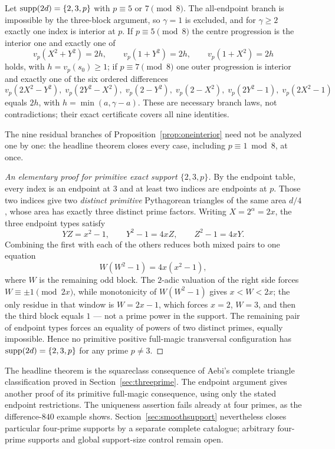 \begin{proposition}\label{prop:oneinterior}
Let $\operatorname{supp}(2d)=\{2,3,p\}$ with $p\equiv5$ or $7\pmod8$. The all-endpoint
branch is impossible by the three-block argument, so $\gamma=1$ is
excluded, and for $\gamma\ge2$ exactly one index is interior at $p$. If
$p\equiv5\pmod8$ the centre progression is the interior one and exactly one
of
\[
v_p(X^2+Y^2)=2h,\qquad v_p(1+Y^2)=2h,\qquad v_p(1+X^2)=2h
\]
holds, with $h=v_p(s_0)\ge1$; if $p\equiv7\pmod8$ one outer progression is
interior and exactly one of the six ordered differences
\[
v_p(2X^2-Y^2),\; v_p(2Y^2-X^2),\; v_p(2-Y^2),\;
v_p(2-X^2),\; v_p(2Y^2-1),\; v_p(2X^2-1)
\]
equals $2h$, with $h=\min(a,\gamma-a)$. These are necessary branch laws,
not contradictions; their exact certificate covers all nine identities.
\end{proposition}

The nine residual branches of Proposition~\ref{prop:oneinterior} need not
be analyzed one by one: the headline theorem closes every case, including
$p\equiv1\bmod8$, at once.

\begin{proof}[An elementary proof for primitive exact support $\{2,3,p\}$]
By the endpoint table, every index is an endpoint at $3$ and at least two
indices are endpoints at $p$. Those two indices give two \emph{distinct
primitive} Pythagorean triangles of the same area $d/4$, whose area has
exactly three distinct prime factors. Writing $X=2^{\alpha}=2x$, the three
endpoint types satisfy
\[
YZ=x^2-1,\qquad Y^2-1=4xZ,\qquad Z^2-1=4xY .
\]
Combining the first with each of the others reduces both mixed pairs to
one equation
\[
W(W^2-1)=4x(x^2-1),
\]
where $W$ is the remaining odd block. The $2$-adic valuation of the right
side forces $W\equiv\pm1\pmod{2x}$, while monotonicity of $W(W^2-1)$ gives
$x<W<2x$; the only residue in that window is $W=2x-1$, which forces
$x=2$, $W=3$, and then the third block equals $1$ --- not a prime power in
the support. The remaining pair of endpoint types forces an equality of
powers of two distinct primes, equally impossible. Hence no primitive
positive full-magic transversal configuration has $\operatorname{supp}(2d)=\{2,3,p\}$ for any prime
$p\neq3$.
\end{proof}

\begin{remark}
The headline theorem is the squareclass consequence of Aebi's complete
triangle classification proved in Section~\ref{sec:threeprime}. The endpoint
argument gives another proof of its primitive full-magic consequence,
using only the stated endpoint restrictions. The uniqueness assertion fails already at four
primes, as the difference-$840$ example shows. Section~\ref{sec:smoothsupport}
nevertheless closes particular four-prime supports by a separate complete
catalogue; arbitrary four-prime supports and global support-size control
remain open.
\end{remark}



